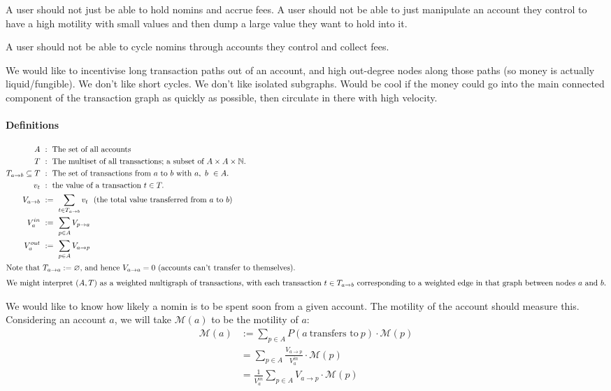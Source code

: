 \documentclass{article}
\begin{document}
A user should not just be able to hold nomins and accrue fees. A user should not be able to just manipulate 
an account they control to have a high motility with small values and then dump a large value they want to hold
into it.

A user should not be able to cycle nomins through accounts they control and collect fees.

We would like to incentivise long transaction paths out of an account, and high out-degree nodes along those paths
(so money is actually liquid/fungible).
We don't like short cycles. We don't like isolated subgraphs. Would be cool if the money could go into the main
connected component of the transaction graph as quickly as possible, then circulate in there with high velocity.


\paragraph{Definitions}
\begin{align*}
    A \ &: \ \text{The set of all accounts} \\
    T \ &: \ \text{The multiset of all transactions; a subset of \(A \times A \times \mathbb{N}.\)} \\
    T_{a \rightarrow b} \subseteq T \ &: \ \text{The set of transactions from \(a\) to \(b\) with \(a, \ b \ \in A\).} \\
    v_t \ &: \ \text{the value of a transaction} \ t \in T. \\
    V_{a \rightarrow b} \ &:= \ \sum_{t \in T_{a \rightarrow b}}{v_t} \ \ \text{(the total value transferred from \(a\) to \(b\))} \\
    V_{a}^{in} \ &:= \ \sum_{p \in A}{V_{p \rightarrow a}} \\
    V_{a}^{out} \ &:= \ \sum_{p \in A}{V_{a \rightarrow p}} \\
    \intertext{Note that \(T_{a \rightarrow a} := \varnothing \), and hence \(V_{a \rightarrow a} = 0\)
               (accounts can't transfer to themselves).}
    \intertext{We might interpret \((A, T)\) as a weighted multigraph of transactions, 
               with each transaction \(t \in T_{a \rightarrow b}\)
               corresponding to a weighted edge in that graph between nodes \(a\) and \(b\).}
\end{align*}

\noindent We would like to know how likely a nomin is to be spent soon from a given account.
The motility of the account should measure this. Considering an account \(a\), we will take
\(\mathcal{M}(a)\) to be the motility of \(a\):
\begin{align*}
    \mathcal{M}(a) &:= \sum_{p \in A}{P(a \ \text{transfers to} \ p) \cdot \mathcal{M}(p)} \\
    &= \sum_{p \in A}{\frac{V_{a \rightarrow p}}{V_{a}^{in}} \cdot \mathcal{M}(p)} \\
    &= \frac{1}{V_{a}^{in}} \sum_{p \in A}{V_{a \rightarrow p} \cdot \mathcal{M}(p)}
\end{align*}
\end{document}
